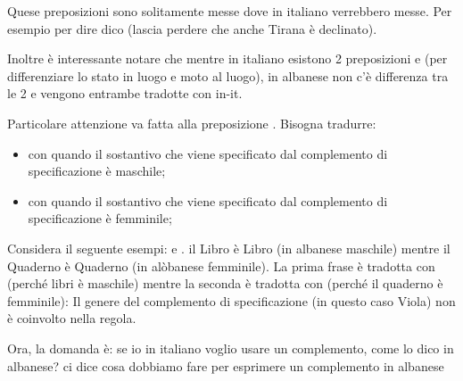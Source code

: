 Quese preposizioni sono solitamente messe dove in italiano verrebbero messe. Per esempio per dire  dico  (lascia perdere che anche Tirana è declinato).

Inoltre è interessante notare che mentre in italiano esistono 2 preposizioni  e  (per differenziare lo stato in luogo e moto al luogo), in albanese non c'è differenza tra le 2 e vengono entrambe tradotte con \glsdesc{in-it}.

Particolare attenzione va fatta alla preposizione . Bisogna tradurre:

\begin{itemize}
    \item {} con  quando il sostantivo che viene specificato dal complemento di specificazione è maschile;
    \item {} con  quando il sostantivo che viene specificato dal complemento di specificazione è femminile;
\end{itemize}

Considera il seguente esempi:  e . il Libro è \glsdesc{Libro} (in albanese maschile) mentre il Quaderno è \glsdesc{Quaderno} (in alòbanese femminile). La prima frase è tradotta con  (perché libri è maschile) mentre la seconda è tradotta con  (perché il quaderno è femminile): Il genere del complemento di specificazione (in questo caso Viola) non è coinvolto nella regola.

Ora, la domanda è: se io in italiano voglio usare un complemento, come lo dico in albanese?  ci dice cosa dobbiamo fare per esprimere un complemento in albanese


